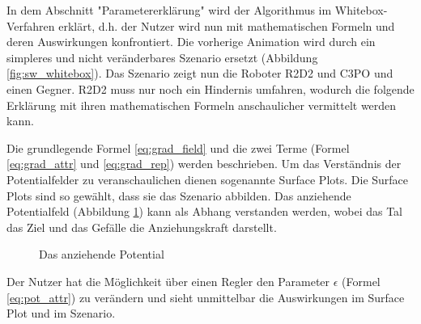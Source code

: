In dem Abschnitt "Parametererklärung" wird der Algorithmus im Whitebox-Verfahren erklärt, d.h. der Nutzer wird nun mit mathematischen Formeln und deren Auswirkungen konfrontiert. Die vorherige Animation wird durch ein simpleres und nicht veränderbares Szenario ersetzt (Abbildung \ref{fig:sw_whitebox}). 
Das Szenario zeigt nun die Roboter R2D2 und C3PO und einen Gegner. R2D2 muss nur noch ein Hindernis umfahren, wodurch die folgende Erklärung mit ihren mathematischen Formeln anschaulicher vermittelt werden kann.

Die grundlegende Formel \ref{eq:grad_field} und die zwei Terme (Formel \ref{eq:grad_attr} und \ref{eq:grad_rep}) werden beschrieben.
Um das Verständnis der Potentialfelder zu veranschaulichen dienen sogenannte Surface Plots. Die Surface Plots sind so gewählt, dass sie das Szenario abbilden. Das anziehende Potentialfeld (Abbildung \ref{fig:surf_attr}) kann als Abhang verstanden werden, wobei das Tal das Ziel und das Gefälle die Anziehungskraft darstellt.
\begin{figure}[h!]
  \centering
  \caption{Das anziehende Potential}
  \label{fig:surf_attr}
\end{figure}
Der Nutzer hat die Möglichkeit über einen Regler den Parameter $\epsilon$ (Formel \ref{eq:pot_attr}) zu verändern und sieht unmittelbar die Auswirkungen im Surface Plot und im Szenario. 
